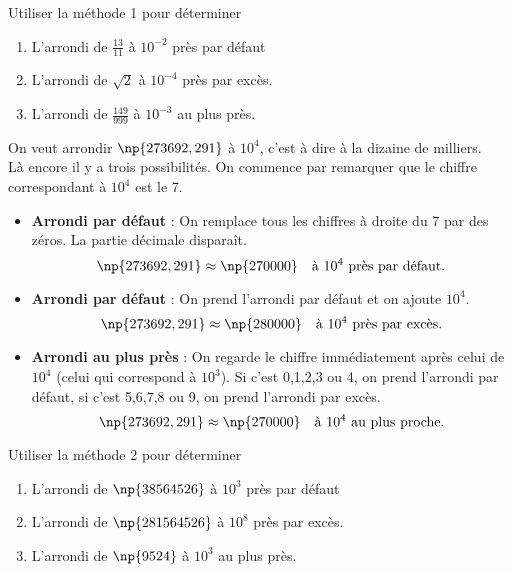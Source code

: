 \begin{exercice}[]
	Utiliser la méthode 1 pour déterminer
	\begin{enumerate}
		\item 	L'arrondi de $\frac{13}{11}$ à $10^{-2}$ près par défaut
		\item 	L'arrondi de $\sqrt{2}$ à $10^{-4}$ près par excès.
		\item 	L'arrondi de $\frac{149}{999}$ à $10^{-3}$ au plus près.
	\end{enumerate}
\end{exercice}

\begin{methode}[ 2]
	On veut arrondir $\np{273692,291}$ à $10^{4}$, c'est à dire à la dizaine de milliers.\\
	Là encore il y a trois possibilités. On commence par remarquer que le chiffre correspondant à $10^4$ est le 7.
	\begin{itemize}
		\item 	\textbf{Arrondi par défaut} : On remplace tous les chiffres à droite du 7 par des zéros. La partie décimale disparaît.
		      $$ \np{273692,291}\approx \np{270000}\quad\textrm{à }10^{4}\textrm{ près par défaut.}$$
		\item  	\textbf{Arrondi par défaut} : On prend l'arrondi par défaut et on ajoute $10^4$.
		      $$ \np{273692,291}\approx \np{280000}\quad\textrm{à }10^{4}\textrm{ près par excès.}$$
		\item 	\textbf{Arrondi au plus près} : On regarde le chiffre immédiatement après celui de $10^4$ (celui qui correspond
		      à $10^{3}$). Si c'est 0,1,2,3 ou 4, on prend l'arrondi par défaut, si c'est 5,6,7,8 ou 9, on prend l'arrondi
		      par excès.
		      $$ \np{273692,291}\approx \np{270000}\quad\textrm{à }10^{4}\textrm{ au plus proche.}$$
	\end{itemize}
\end{methode}

\begin{exercice}[]
	Utiliser la méthode 2 pour déterminer
	\begin{enumerate}
		\item 	L'arrondi de $\np{38564526}$ à $10^3$ près par défaut
		\item 	L'arrondi de $\np{281 564 526}$ à $10^8$ près par excès.
		\item 	L'arrondi de $\np{9524}$ à $10^{3}$ au plus près.
	\end{enumerate}
\end{exercice}

